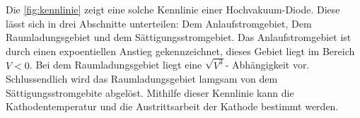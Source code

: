 Die \autoref{fig:kennlinie} zeigt eine solche Kennlinie einer Hochvakuum-Diode.  Diese lässt sich in drei Abschnitte 
unterteilen: Dem Anlaufstromgebiet, Dem Raumladungsgebiet und dem Sättigungsstromgebiet. Das Anlaufstromgebiet ist durch einen
expoentiellen Anstieg gekennzeichnet, dieses Gebiet liegt im Bereich $V < 0$. Bei dem Raumladungsgebiet  liegt eine $\sqrt{V^3}$- Abhängigkeit vor.
Schlussendlich wird das Raumladungsgebiet lamgsam von dem Sättigungsstromgebite abgelöst. 
Mithilfe dieser Kennlinie kann die Kathodentemperatur und die Austrittsarbeit der Kathode bestimmt werden.